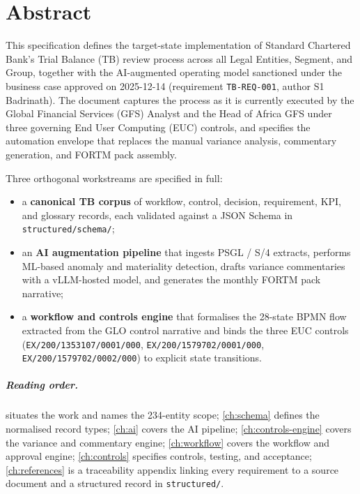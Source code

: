 \chapter*{Abstract}

This specification defines the target-state implementation of Standard
Chartered Bank's Trial Balance (TB) review process across all Legal
Entities, Segment, and Group, together with the AI-augmented operating
model sanctioned under the business case approved on 2025-12-14
(requirement \texttt{TB-REQ-001}, author S1 Badrinath). The document
captures the process as it is currently executed by the Global Financial
Services (GFS) Analyst and the Head of Africa GFS under three governing
End User Computing (EUC) controls, and specifies the automation
envelope that replaces the manual variance analysis, commentary
generation, and FORTM pack assembly.

Three orthogonal workstreams are specified in full:

\begin{itemize}
  \item a \textbf{canonical TB corpus} of workflow, control, decision,
        requirement, KPI, and glossary records, each validated against
        a JSON Schema in \corpus\texttt{structured/schema/};
  \item an \textbf{AI augmentation pipeline} that ingests
        PSGL / S/4 extracts, performs ML-based anomaly and materiality
        detection, drafts variance commentaries with a vLLM-hosted
        model, and generates the monthly FORTM pack narrative;
  \item a \textbf{workflow and controls engine} that formalises the
        28-state BPMN flow extracted from the GLO control narrative
        and binds the three EUC controls (\texttt{EX/200/1353107/0001/000},
        \texttt{EX/200/1579702/0001/000}, \texttt{EX/200/1579702/0002/000})
        to explicit state transitions.
\end{itemize}

\paragraph{Reading order.}  situates the work and
names the 234-entity scope; \cref{ch:schema} defines the normalised
record types; \cref{ch:ai} covers the AI pipeline; \cref{ch:controls-engine}
covers the variance and commentary engine; \cref{ch:workflow} covers
the workflow and approval engine; \cref{ch:controls} specifies controls,
testing, and acceptance; \cref{ch:references} is a traceability
appendix linking every requirement to a source document and a structured
record in \corpus\texttt{structured/}.

